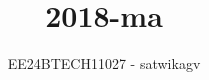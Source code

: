 \documentclass[journal]{IEEEtran}
\begin{document}

\vspace{3cm}

\title{2018-ma}
\author{EE24BTECH11027 - satwikagv}
{\let\newpage\relax\maketitle}

\renewcommand{\thefigure}{\theenumi}
\renewcommand{\thetable}{\theenumi}
\setlength{\intextsep}{10pt} %


\renewcommand{\thetable}{\theenumi}
\end{document}

